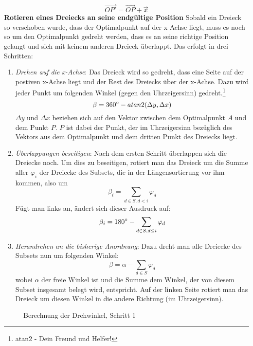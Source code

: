 \documentclass[a4paper, notitlepage, 12pt,headinclude]{scrartcl}
\begin{document}
\begin{equation}
\overrightarrow{OP'} = \overrightarrow{OP} + \vec{x}
\end{equation}
\textbf{Rotieren eines Dreiecks an seine endgültige Position} \quad Sobald ein Dreieck so verschoben wurde, dass der Optimalpunkt auf der x-Achse liegt, muss es noch so um den Optimalpunkt gedreht werden, dass es an seine richtige Position gelangt und sich mit keinem anderen Dreieck überlappt. Das erfolgt in drei Schritten:
\begin{enumerate}
	\item \textit{Drehen auf die x-Achse}: Das Dreieck wird so gedreht, dass eine Seite auf der postiven x-Achse liegt und der Rest des Dreiecks über der x-Achse. Dazu wird jeder Punkt um folgenden Winkel (gegen den Uhrzeigersinn) gedreht.\footnote{atan2 - Dein Freund und Helfer!}
	\begin{equation}
	\beta = 360\degree - atan2(\Delta y, \Delta x)
	\end{equation}
	$\Delta y$ und $\Delta x$ beziehen sich auf den Vektor zwischen dem Optimalpunkt $A$ und dem Punkt $P$. $P$ ist dabei der Punkt, der im Uhrzeigersinn bezüglich des Vektors aus dem Optimalpunkt und dem dritten Punkt des Dreiecks liegt.
	\item \textit{Überlappungen beseitigen}: Nach dem ersten Schritt überlappen sich die Dreiecke noch. Um dies zu beseitigen, rotiert man das Dreieck um die Summe aller $\varphi_i$ der Dreiecke des Subsets, die in der Längensortierung vor ihm kommen, also um
	\begin{equation}
	\beta_i = \sum_{d \in S, d < i} \varphi_d
	\end{equation}
	Fügt man links an, ändert sich dieser Ausdruck auf:
	\begin{equation}
	\beta_i = 180\degree - \sum_{d \in S, d \leq i} \varphi_d
	\end{equation}
	\item \textit{Herandrehen an die bisherige Anordnung}: Dazu dreht man alle Dreiecke des Subsets nun um folgenden Winkel:
	\begin{equation}
	\beta = \alpha - \sum_{d \in S} \varphi_d
	\end{equation}
	wobei $\alpha$ der freie Winkel ist und die Summe dem Winkel, der von diesem Subset insgesamt belegt wird, entspricht. Auf der linken Seite rotiert man das Dreieck um diesen Winkel in die andere Richtung (im Uhrzeigersinn).
\end{enumerate}
\begin{figure}[H]
	\centering {}
	\caption{Berechnung der Drehwinkel, Schritt 1}
\end{figure}
\end{document}
